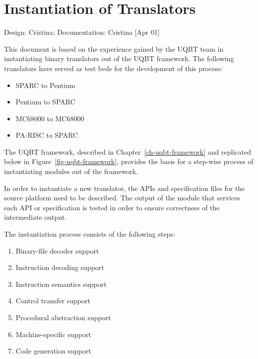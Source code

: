 
\chapter{Instantiation of Translators}
\label{ch-instantiation} 

{\small
\begin{flushright}
Design: Cristina; Documentation: Cristina [Apr 01]
\end{flushright}
}


This document is based on the experience gained by the 
UQBT team in instantiating binary translators out of the UQBT framework.  
The following translators have served as test beds for the 
development of this process: 

\begin{itemize}
\item SPARC to Pentium
\item Pentium to SPARC
\item MC68000 to MC68000
\item PA-RISC to SPARC 
\end{itemize}

The UQBT framework, described in Chapter~\ref{ch-uqbt-framework} 
and replicated below in Figure~\ref{fig-uqbt-framework}, provides 
the basis for a step-wise process of instantiating modules out of
the framework.  


In order to instantiate a new translator, the APIs and specification 
files for the source platform need to be described. 
The output of the module that services each API or specification is 
tested in order to ensure correctness of the intermediate output.  

The instantiation process consists of the following steps: 
\begin{enumerate}
\item Binary-file decoder support

\item Instruction decoding support 

\item Instruction semantics support

\item Control transfer support

\item Procedural abstraction support

\item Machine-specific support

\item Code generation support
\end{enumerate}

